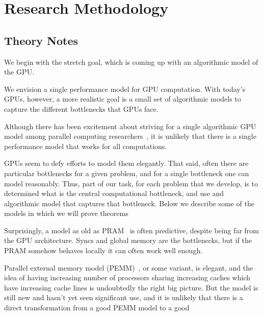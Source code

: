 \section{Research Methodology}


\subsection{Theory Notes}


We begin with the stretch goal, which is coming up with an algorithmic model of the GPU.

\begin{rproblem}
We envision a single performance model for GPU computation.  With today's GPUs, however, a more realistic goal is a small set of algorithmic models to capture the different bottlenecks that GPUs face.
\end{rproblem}

Although there has been excitement about striving for a single algorithmic GPU model among parallel computing researchers~\cite{cite-stuff}, it is unlikely that there is a single performance model that works for all computations.

GPUs seem to defy efforts to model them elegantly. 
That said, often there are particular bottlenecks for a given problem, and for a single bottleneck one can model reasonably. 
Thus, part of our task, for each problem that we develop, is to determined what is the central computational bottleneck, and use and algorithmic model that captures that bottleneck.  Below we describe some of the models in which we will prove theorems


Surprisingly, a model as old as PRAM~\cite{cite-PRAM} is often predictive, despite being far from the GPU architecture. Syncs and global memory are the bottlenecks, but if the PRAM somehow behaves locally it can often work well enough.

Parallel external memory model (PEMM)~\cite{cite-PEMM}, or some variant, is elegant, and the idea of having increasing number of processors sharing increasing caches which have increasing cache lines is undoubtedly the right big picture.  But the model is still new and hasn't yet seen significant use, and it is unlikely that there is a direct transformation from a good PEMM model to a good

